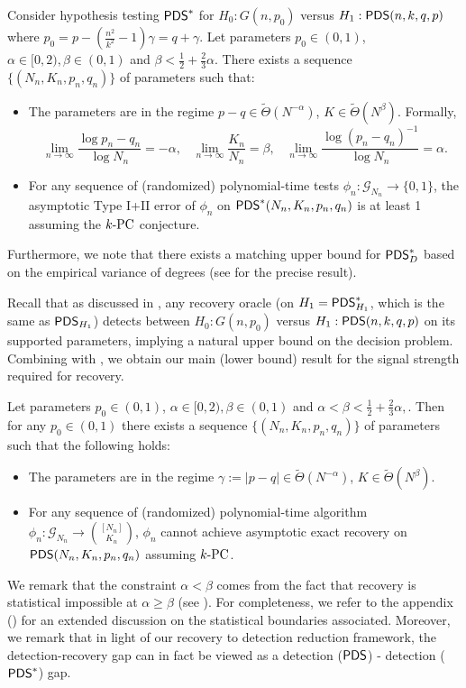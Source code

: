 \documentclass[final,12pt]{colt2023} %
\newcommand\1[1]{\mathbb{I}_{\left\{#1\right\}}}
\begin{document}
\begin{theorem} \label{PDSbound}
Consider hypothesis testing $\mathsf{PDS}^*$ for $H_0: G(n, p_0)$ versus $H_1: \mathsf{PDS}(n, k, q, p)$ where $p_0=p-(\frac{n^2}{k^2}-1)\gamma=q+\gamma$. Let parameters $p_0\in(0, 1)$, $\alpha\in[0,2), \beta\in (0,1)$ and $\beta<\frac{1}{2}+\frac{2}{3}\alpha$. There exists a sequence $\{(N_n, K_n, p_n, q_n)\}$ of parameters such that:
\begin{itemize}
\item The parameters are in the regime $p-q\in \tilde\Theta(N^{-\alpha})$, $K\in\tilde\Theta(N^\beta)$. Formally,
$$\lim_{n\to\infty}\frac{\log p_n-q_n}{\log N_n}=-\alpha,\;\;\;\lim_{n\to\infty}\frac{K_n}{N_n}=\beta,\;\;\;\lim_{n\to\infty}\frac{\log(p_n-q_n)^{-1}}{\log N_n}=\alpha.$$
\item For any sequence of (randomized) polynomial-time tests $\phi_n : \mathcal{G}_{N_n} \to \{0, 1\}$, the asymptotic
Type I+II error of $\phi_n$ on  $\mathsf{PDS}^*(N_n, K_n, p_n, q_n)$ is at least 1 assuming the $k\textup{-PC}$ conjecture.
\end{itemize}

\end{theorem}


Furthermore, we note that there exists a matching upper bound for $\mathsf{PDS}^*_D$ based on the empirical variance of degrees (see  for the precise result). 

Recall that as discussed in , any recovery oracle (on $H_1=\mathsf{PDS}^*_{H_1}$, which is the same as $\mathsf{PDS}_{H_1}$) detects between $H_0: G(n, p_0)$ versus $H_1: \mathsf{PDS}(n, k, q, p)$ on its supported parameters, implying a natural upper bound on the decision problem.
Combining  with , we obtain our main (lower bound) result for the signal strength required for recovery.
\begin{corollary}  \label{RECOVBOUND}
Let parameters $p_0\in(0, 1)$, $\alpha\in[0,2), \beta\in (0,1)$ and $\alpha< \beta<\frac{1}{2}+\frac{2}{3}\alpha, $. Then for any $p_0\in (0,1)$ there exists a sequence $\{(N_n, K_n, p_n, q_n)\}$ of parameters such that the following holds:
\begin{itemize}
\item The parameters are in the regime $\gamma:=|p-q|\in \tilde\Theta(N^{-\alpha})$, $K\in\tilde\Theta(N^\beta)$.
\item For any sequence of (randomized) polynomial-time algorithm  $\phi_n : \mathcal{G}_{N_n} \to {[N_n]\choose K_n}$, $\phi_n$ cannot achieve asymptotic exact recovery on $\mathsf{PDS}(N_n, K_n, p_n, q_n)$ assuming $k\textup{-PC}$.
\end{itemize}
\end{corollary}
We remark that the constraint $\alpha<\beta$ comes from the fact that recovery is statistical impossible at $\alpha\geq \beta$ (see ). For completeness, we refer to the appendix () for an extended discussion on the statistical boundaries associated. Moreover, we remark that in light of our recovery to detection reduction framework, the detection-recovery gap can in fact be viewed as a detection ($\mathsf{PDS}$) - detection ($\mathsf{PDS}^*$) gap.
\end{document}

